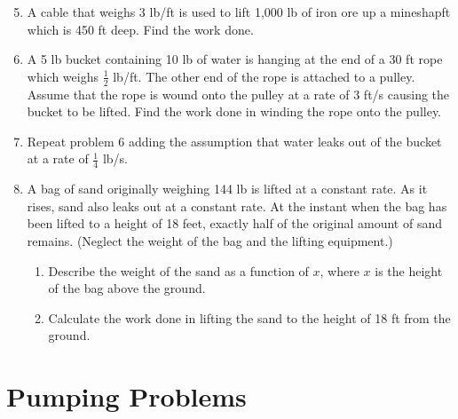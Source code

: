 \documentclass[12pt]{article}
\newif\ifans
\begin{document}
\begin{enumerate}
\setcounter{enumi}{4}
\item A cable that weighs 3 lb/ft is used to lift 1,000 lb of iron ore up a mineshapft which is 450 ft deep.  Find the work done.

\ifans{\fbox{753,750 ft$\cdot$lb}} \fi

\item A 5 lb bucket containing 10 lb of water is hanging at the end of a 30 ft rope which weighs $\frac{1}{2}$ lb/ft.  The other end of the rope is attached to a pulley.  Assume that the rope is wound onto the pulley at a rate of 3 ft/s causing the bucket to be lifted. Find the work done in winding the rope onto the pulley.

\ifans{\fbox{675 ft$\cdot$lb}} \fi

\item Repeat problem 6 adding the assumption that water leaks out of the bucket at a rate of $\frac{1}{4}$ lb/s.

\ifans{\fbox{$\frac{1275}{2}$ ft$\cdot$lb}} \fi

\item A bag of sand originally weighing 144 lb is lifted at a constant rate.  As it rises, sand also leaks out at a constant rate.  At the instant when the bag has been lifted to a height of 18 feet, exactly half of the original amount of sand remains.  (Neglect the weight of the bag and the lifting equipment.)

\begin{enumerate}

\item Describe the weight of the sand as a function of $x$, where $x$ is the height of the bag above the ground.

\ifans{\fbox{$w(x)=144-4x$}} \fi

\item Calculate the work done in lifting the sand to the height of 18 ft from the ground.

\ifans{\fbox{1944 ft$\cdot$lb}} \fi

\end{enumerate}

\end{enumerate}

\section*{Pumping Problems}
\end{document}
